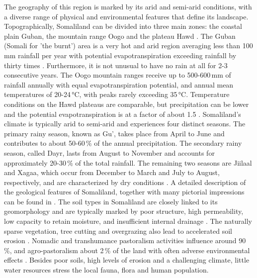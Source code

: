 The geography of this region is marked by its arid and semi-arid conditions, with a diverse range of physical and environmental features that define its landscape. Topographically, Somaliland can be divided into three main zones: the coastal plain Guban, the mountain range Oogo and the plateau Hawd \autocite{republicofsomaliaCountryProfile20212021}. The Guban (Somali for 'the burnt') area is a very hot and arid region averaging less than 100\,mm rainfall per year with potential evapotranspiration exceeding rainfall by thirty times \autocite{salemTerritorialDiagnosticReport2016}. Furthermore, it is not unusual to have no rain at all for 2-3 consecutive years. The Oogo mountain ranges receive up to 500-600\,mm of rainfall annually with equal evapotranspiration potential, and annual mean temperatures of 20-24\,°C, with peaks rarely exceeding 35\,°C. Temperature conditions on the Hawd plateaus are comparable, but precipitation can be lower and the potential evapotranspiration is at a factor of about 1.5 \autocite{abdulkadirAssessmentDroughtRecurrence2017,salemTerritorialDiagnosticReport2016}. 
Somaliland's climate is typically arid to semi-arid and experiences four distinct seasons. The primary rainy season, known as Gu', takes place from April to June and contributes to about 50-60\,\% of the annual precipitation. The secondary rainy season, called Dayr, lasts from August to November and accounts for approximately 20-30\,\% of the total rainfall. The remaining two seasons are Jiilaal and Xagaa, which occur from December to March and July to August, respectively, and are characterized by dry conditions \autocite{abdulkadirAssessmentDroughtRecurrence2017,republicofsomaliaCountryProfile20212021}.
A detailed description of the geological features of Somaliland, together with many pictorial impressions can be found in \autocite{petrucciLandscapeLandformsNorthern2022}. The soil types in Somaliland are closely linked to its geomorphology and are typically marked by poor structure, high permeability, low capacity to retain moisture, and insufficient internal drainage \autocite{salemTerritorialDiagnosticReport2016}. The naturally sparse vegetation, tree cutting and overgrazing also lead to accelerated soil erosion \autocite{salemTerritorialDiagnosticReport2016}. Nomadic and transhumance pastoralism activities influence around 90\,\%, and agro-pastoralism about 2\,\% of the land with often adverse environmental effects \autocite{salemTerritorialDiagnosticReport2016}. Besides poor soils, high levels of erosion and a challenging climate, little water resources stress the local fauna, flora and human population. 

